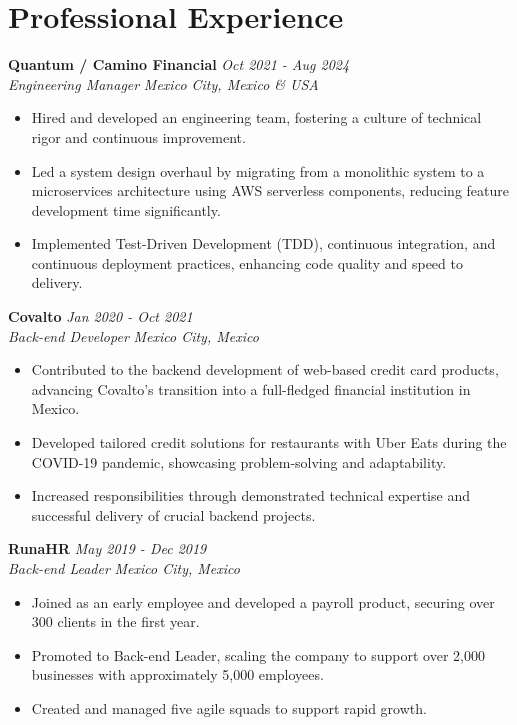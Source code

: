 \documentclass[a4paper,10pt]{article}
\begin{document}
\section*{Professional Experience}
\sectionline
\vspace{-1em}

\textbf{Quantum / Camino Financial} \hfill \textit{Oct 2021 - Aug 2024} \\
\textit{Engineering Manager} \hfill \textit{Mexico City, Mexico \& USA} \\
\begin{itemize}[leftmargin=0.5cm, topsep=0pt, parsep=0pt, itemsep=2pt]
    \item Hired and developed an engineering team, fostering a culture of technical rigor and continuous improvement.
    \item Led a system design overhaul by migrating from a monolithic system to a microservices architecture using AWS serverless components, reducing feature development time significantly.
    \item Implemented Test-Driven Development (TDD), continuous integration, and continuous deployment practices, enhancing code quality and speed to delivery.
\end{itemize}

\textbf{Covalto} \hfill \textit{Jan 2020 - Oct 2021} \\
\textit{Back-end Developer} \hfill \textit{Mexico City, Mexico} \\
\begin{itemize}[leftmargin=0.5cm, topsep=0pt, parsep=0pt, itemsep=2pt]
    \item Contributed to the backend development of web-based credit card products, advancing Covalto’s transition into a full-fledged financial institution in Mexico.
    \item Developed tailored credit solutions for restaurants with Uber Eats during the COVID-19 pandemic, showcasing problem-solving and adaptability.
    \item Increased responsibilities through demonstrated technical expertise and successful delivery of crucial backend projects.
\end{itemize}

\textbf{RunaHR} \hfill \textit{May 2019 - Dec 2019} \\
\textit{Back-end Leader} \hfill \textit{Mexico City, Mexico} \\
\begin{itemize}[leftmargin=0.5cm, topsep=0pt, parsep=0pt, itemsep=2pt]
    \item Joined as an early employee and developed a payroll product, securing over 300 clients in the first year.
    \item Promoted to Back-end Leader, scaling the company to support over 2,000 businesses with approximately 5,000 employees.
    \item Created and managed five agile squads to support rapid growth.
\end{itemize}
\end{document}
